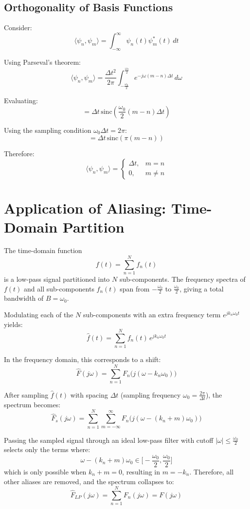 \documentclass{article}
\begin{document}
\subsection*{Orthogonality of Basis Functions}

Consider:
\[
\langle \psi_n, \psi_m \rangle
= \int_{-\infty}^{\infty} \psi_n(t)\psi_m^*(t)\,dt
\]

Using Parseval’s theorem:
\[
\langle \psi_n, \psi_m \rangle
= \frac{\Delta t^2}{2\pi}
\int_{-\frac{\omega_0}{2}}^{\frac{\omega_0}{2}}
e^{-j\omega (m-n)\Delta t} \, d\omega
\]

Evaluating:
\[
= \Delta t \,
\text{sinc}\left(\frac{\omega_0}{2}(m-n)\Delta t\right)
\]

Using the sampling condition $\omega_0 \Delta t = 2\pi$:
\[
= \Delta t \, \text{sinc}(\pi (m-n))
\]

Therefore:
\[
\langle \psi_n, \psi_m \rangle =
\begin{cases}
\Delta t, & m = n \\
0, & m \neq n
\end{cases}
\]


\section{Application of Aliasing: Time-Domain Partition}

The time-domain function
\[
f(t) = \sum_{n=1}^{N} f_n(t)
\]
is a low-pass signal partitioned into \(N\) sub-components. The frequency spectra of \(f(t)\) and all sub-components \(f_n(t)\) span from \(-\frac{\omega_0}{2}\) to \(\frac{\omega_0}{2}\), giving a total bandwidth of \(B = \omega_0\).

Modulating each of the \(N\) sub-components with an extra frequency term \(e^{jk_n \omega_0 t}\) yields:
\[
\hat{f}(t) = \sum_{n=1}^{N} f_n(t) \, e^{j k_n \omega_0 t}
\]

In the frequency domain, this corresponds to a shift:
\[
\hat{F}(j\omega) = \sum_{n=1}^{N} F_n\big(j(\omega - k_n \omega_0)\big)
\]

After sampling \(\hat{f}(t)\) with spacing \(\Delta t\) (sampling frequency \(\omega_0 = \frac{2\pi}{\Delta t}\)), the spectrum becomes:
\[
\hat{F}_s(j\omega)
= \sum_{n=1}^{N} \sum_{m=-\infty}^{\infty} F_n\big(j(\omega - (k_n+m)\omega_0)\big)
\]

Passing the sampled signal through an ideal low-pass filter with cutoff \(|\omega| \le \frac{\omega_0}{2}\) selects only the terms where:
\[
\omega - (k_n + m)\omega_0 \in \Big[-\frac{\omega_0}{2}, \frac{\omega_0}{2}\Big]
\]
which is only possible when \(k_n + m = 0\), resulting in \(m = -k_n\). Therefore, all other aliases are removed, and the spectrum collapses to:
\[
\hat{F}_{LP}(j\omega) = \sum_{n=1}^{N} F_n(j\omega) = F(j\omega)
\]
\end{document}
